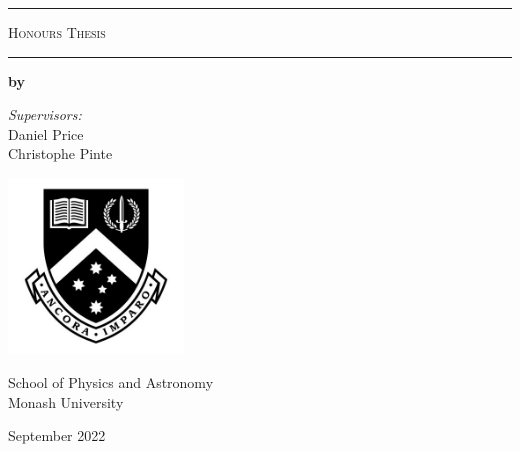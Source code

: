 \begin{titlepage}
    \begin{center}
        \par\noindent\rule{\textwidth}{0.8pt}
       
        \vspace*{1cm}

        \makeatletter
        {\LARGE\textbf{\@title}}

        \vspace{0.5cm}

        \textsc{Honours Thesis}

        \vspace{0.4cm}

        \par\noindent\rule{\textwidth}{0.8pt}
       
        \vspace{0.9cm}

        {\Large\textbf{by \@author}} \\
        \makeatother
        
        \vspace{0.75cm}
        
        {\large\textit{Supervisors:} \\ Daniel Price \\ Christophe Pinte}

        \vfill
        
        \includegraphics[width=0.35\textwidth]{images/monash_logo.jpg}
        
            
        School of Physics and Astronomy\\
        Monash University\\
        
        \vspace{1.0cm}
        
        {\large September 2022}
            
    \end{center}
\end{titlepage}